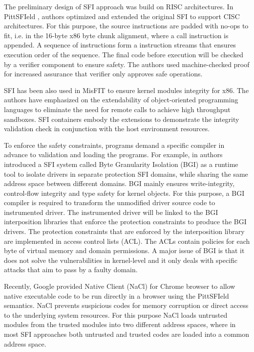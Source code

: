 The preliminary design of SFI approach was build on RISC
architectures. In PittSFIeld \cite{PittSFIeld}, authors optimized and
extended the original SFI to support CISC architectures. For this
purpose, the source instructions are padded with no-ops to fit, i.e.
in the 16-byte x86 byte chunk alignment, where a call instruction is
appended. A sequence of instructions form a instruction streams that
ensures execution order of the sequence. The final code before
execution will be checked by a verifier component to ensure safety.
The authors used machine-checked proof for increased assurance that
verifier only approves safe operations.

SFI has been also used in MisFIT \cite{MISFit} to ensure kernel
modules integrity for x86. The authors have emphasized on the
extendability of object-oriented programming languages to eliminate
the need for remote calls to achieve high throughput sandboxes. SFI
containers embody the extensions to demonstrate the integrity
validation check in conjunction with the host environment resources.

To enforce the safety constraints, programs demand a specific compiler
in advance to validation and loading the programs. For example, in
\cite{Castro-BGI} authors introduced a SFI system called Byte
Granularity Isolation (BGI) as a runtime tool to isolate drivers in
separate protection SFI domains, while sharing the same address space
between different domains. BGI mainly ensures write-integrity,
control-flow integrity and type safety for kernel objects. For this
purpose, a BGI compiler is required to transform the unmodified driver
source code to instrumented driver. The instrumented driver will be
linked to the BGI interposition libraries that enforce the protection
constraints to produce the BGI drivers. The protection constraints
that are enforced by the interposition library are implemented in
access control lists (ACL). The ACLs contain policies for each byte of
virtual memory and domain permissions. A major issue of BGI is that it
does not solve the vulnerabilities in kernel-level and it only deals
with specific attacks that aim to pass by a faulty domain.


Recently, Google provided Native Client (NaCl) \cite{NaCl-09} for
Chrome browser to allow native executable code to be run directly in a
browser using the PittSFIeld semantics. NaCl prevents suspicious codes
for memory corruption or direct access to the underlying system
resources. For this purpose NaCl loads untrusted modules from the
trusted modules into two different address spaces, where in most SFI
approaches both untrusted and trusted codes are loaded into a common
address space.

